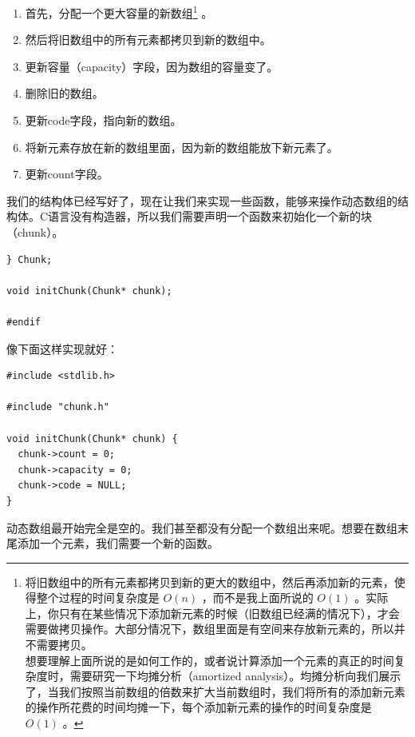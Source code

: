 \documentclass[cn,10pt,math=newtx,citestyle=gb7714-2015,bibstyle=gb7714-2015]{elegantbook}
\newenvironment{code}{\captionsetup{type=listing}}{}
\begin{document}
\begin{enumerate}
\item 首先，分配一个更大容量的新数组\footnote{将旧数组中的所有元素都拷贝到新的更大的数组中，然后再添加新的元素，使得整个过程的时间复杂度是 $O(n)$ ，而不是我上面所说的 $O(1)$ 。实际上，你只有在某些情况下添加新元素的时候（旧数组已经满的情况下），才会需要做拷贝操作。大部分情况下，数组里面是有空间来存放新元素的，所以并不需要拷贝。 \\ 想要理解上面所说的是如何工作的，或者说计算添加一个元素的真正的时间复杂度时，需要研究一下均摊分析（amortized analysis）。均摊分析向我们展示了，当我们按照当前数组的倍数来扩大当前数组时，我们将所有的添加新元素的操作所花费的时间均摊一下，每个添加新元素的操作的时间复杂度是 $O(1)$ 。} 。
\item 然后将旧数组中的所有元素都拷贝到新的数组中。
\item 更新容量（capacity）字段，因为数组的容量变了。
\item 删除旧的数组。
\item 更新code字段，指向新的数组。
\item 将新元素存放在新的数组里面，因为新的数组能放下新元素了。
\item 更新count字段。
\end{enumerate}

我们的结构体已经写好了，现在让我们来实现一些函数，能够来操作动态数组的结构体。C语言没有构造器，所以我们需要声明一个函数来初始化一个新的块（chunk）。

\begin{code}
\begin{verbatim}
} Chunk;

void initChunk(Chunk* chunk);

#endif
\end{verbatim}
\end{code}

像下面这样实现就好：

\begin{code}
\begin{verbatim}
#include <stdlib.h>

#include "chunk.h"

void initChunk(Chunk* chunk) {
  chunk->count = 0;
  chunk->capacity = 0;
  chunk->code = NULL;
}
\end{verbatim}
\end{code}

动态数组最开始完全是空的。我们甚至都没有分配一个数组出来呢。想要在数组末尾添加一个元素，我们需要一个新的函数。
\end{document}
